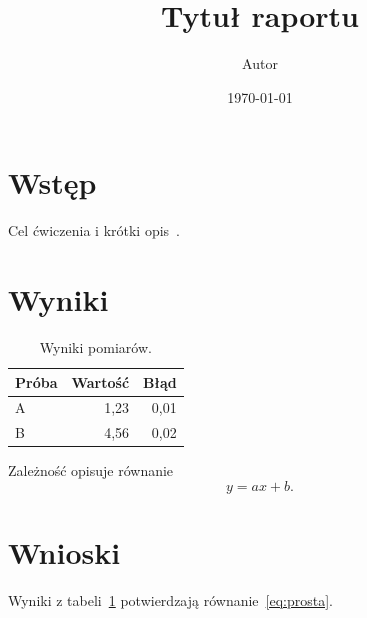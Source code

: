 \documentclass[a4paper,11pt]{article}
\title{Tytuł raportu}
\author{Autor}
\date{\today}
\begin{document}
\maketitle

\section{Wstęp}
Cel ćwiczenia i krótki opis~\cite{knuth1984}.

\section{Wyniki}
\begin{table}[h]
  \centering
  \begin{tabular}{lrr}
    \toprule
    Próba & Wartość & Błąd \\
    \midrule
    A & 1,23 & 0,01 \\
    B & 4,56 & 0,02 \\
    \bottomrule
  \end{tabular}
  \caption{Wyniki pomiarów.}
  \label{tab:wyniki}
\end{table}

Zależność opisuje równanie
\begin{equation}
  y = a x + b .
  \label{eq:prosta}
\end{equation}

\section{Wnioski}
Wyniki z tabeli~\ref{tab:wyniki} potwierdzają równanie~\eqref{eq:prosta}.



\end{document}
